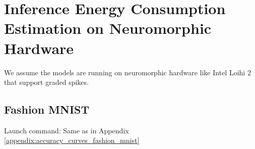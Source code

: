 \section{Inference Energy Consumption Estimation on Neuromorphic Hardware}
\label{appendix:energy_neuromorphic}

    We assume the models are running on neuromorphic hardware like Intel Loihi 2 that support graded spikes. 

    \subsection{Fashion MNIST}
    \label{appendix:energy_neuromorphic_fashion_mnist}
        Launch command: Same as in Appendix \ref{appendix:accuracy_curves_fashion_mnist}

        \begin{figure}[H]
            \centering
            \begin{subfigure}[H]{0.495\textwidth}

\end{subfigure}
\end{figure}

